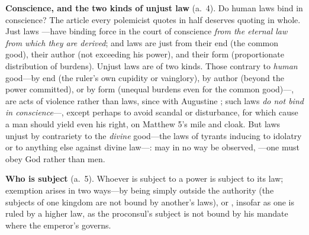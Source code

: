 \textbf{Conscience, and the two kinds of unjust law} (a.~4). Do human laws bind in conscience? The article every polemicist quotes in half deserves quoting in whole. Just laws ---have binding force in the court of conscience \emph{from the eternal law from which they are derived}; and laws are just from their end (the common good), their author (not exceeding his power), and their form (proportionate distribution of burdens). Unjust laws are of two kinds. Those contrary to \emph{human} good---by end (the ruler's own cupidity or vainglory), by author (beyond the power committed), or by form (unequal burdens even for the common good)---, are acts of violence rather than laws, since with Augustine ; such laws \emph{do not bind in conscience}---, except perhaps to avoid scandal or disturbance, for which cause a man should yield even his right, on Matthew 5's mile and cloak. But laws unjust by contrariety to the \emph{divine} good---the laws of tyrants inducing to idolatry or to anything else against divine law---: may in no way be observed, ---one must obey God rather than men.

\textbf{Who is subject} (a.~5). Whoever is subject to a power is subject to its law; exemption arises in two ways---by being simply outside the authority (the subjects of one kingdom are not bound by another's laws), or , insofar as one is ruled by a higher law, as the proconsul's subject is not bound by his mandate where the emperor's governs.


